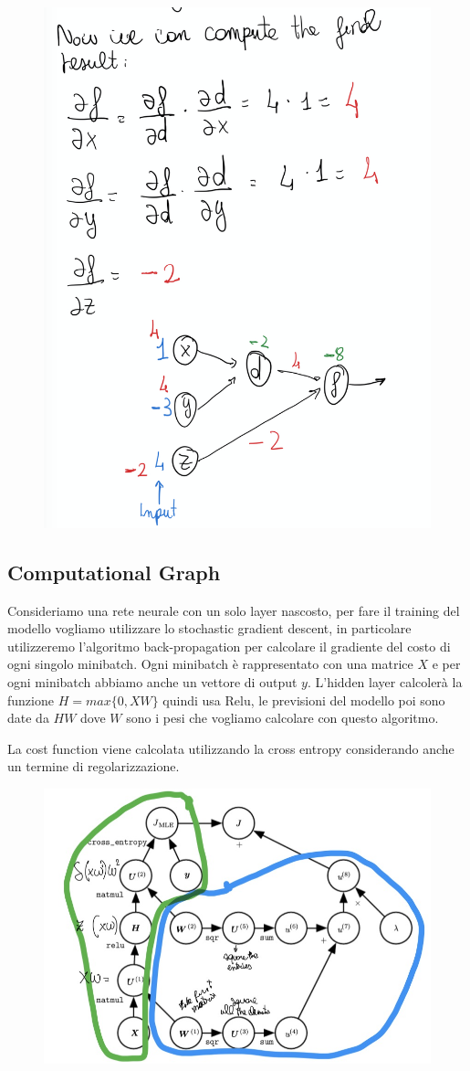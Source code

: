 \documentclass[14pt]{extreport}
\begin{document}
\begin{figure}[H]
	\centering
	\includegraphics[width=0.7\linewidth]{432.jpeg}
\end{figure}

\subsection{Computational Graph}

Consideriamo una rete neurale con un solo layer nascosto, per fare il training del modello vogliamo utilizzare lo stochastic gradient descent, in
particolare utilizzeremo l'algoritmo back-propagation per calcolare il gradiente del costo di ogni singolo minibatch. Ogni minibatch è rappresentato
con una matrice $X$ e per ogni minibatch abbiamo anche un vettore di output $y$. L'hidden layer calcolerà la funzione $H = max\{0, XW\}$ quindi usa
Relu, le previsioni del modello poi sono date da $HW$ dove $W$ sono i pesi che vogliamo calcolare con questo algoritmo.

La cost function viene calcolata utilizzando la cross entropy considerando anche un termine di regolarizzazione.


\begin{figure}[H]
	\centering
	\includegraphics[width=0.7\linewidth]{396.jpeg}
\end{figure}
\end{document}
